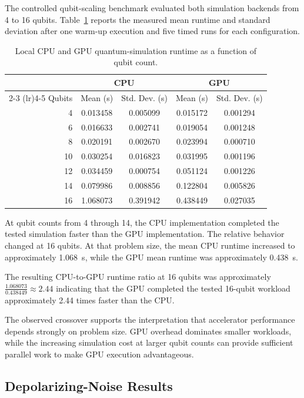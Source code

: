 \documentclass[pdflatex,sn-mathphys-num]{sn-jnl}%
\theoremstyle{thmstyleone}%
\theoremstyle{thmstyletwo}%
\theoremstyle{thmstylethree}%
\begin{document}
The controlled qubit-scaling benchmark evaluated both simulation backends from
4 to 16 qubits. Table~\ref{tab:qubit-scaling} reports the measured mean runtime
and standard deviation after one warm-up execution and five timed runs for each
configuration.

\begin{table}[htbp]
\centering
\caption{Local CPU and GPU quantum-simulation runtime as a function of qubit
count.}
\label{tab:qubit-scaling}
\begin{tabular}{rcccc}
\toprule
 & \multicolumn{2}{c}{CPU} & \multicolumn{2}{c}{GPU} \\
\cmidrule(lr){2-3}
\cmidrule(lr){4-5}
Qubits &
Mean (s) &
Std. Dev. (s) &
Mean (s) &
Std. Dev. (s) \\
\midrule
4  & 0.013458 & 0.005099 & 0.015172 & 0.001294 \\
6  & 0.016633 & 0.002741 & 0.019054 & 0.001248 \\
8  & 0.020191 & 0.002670 & 0.023994 & 0.000710 \\
10 & 0.030254 & 0.016823 & 0.031995 & 0.001196 \\
12 & 0.034459 & 0.000754 & 0.051124 & 0.001226 \\
14 & 0.079986 & 0.008856 & 0.122804 & 0.005826 \\
16 & 1.068073 & 0.391942 & 0.438449 & 0.027035 \\
\bottomrule
\end{tabular}
\end{table}

At qubit counts from 4 through 14, the CPU implementation completed the tested
simulation faster than the GPU implementation. The relative behavior changed at
16 qubits. At that problem size, the mean CPU runtime increased to approximately
1.068~s, while the GPU mean runtime was approximately 0.438~s.

The resulting CPU-to-GPU runtime ratio at 16 qubits was approximately \(\frac{1.068073}{0.438449} \approx 2.44\) indicating that the GPU completed the tested 16-qubit workload approximately
2.44 times faster than the CPU.

The observed crossover supports the interpretation that accelerator performance
depends strongly on problem size. GPU overhead dominates smaller workloads,
while the increasing simulation cost at larger qubit counts can provide
sufficient parallel work to make GPU execution advantageous.


\subsection{Depolarizing-Noise Results}
\label{subsec:noise-results}
\end{document}
